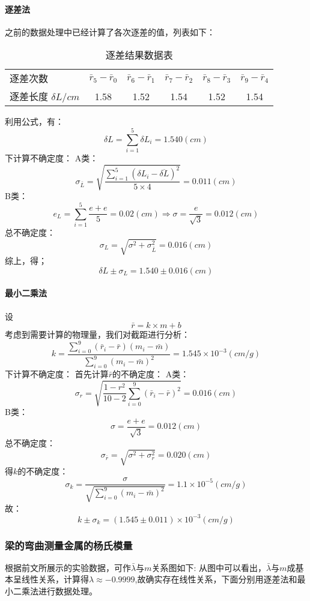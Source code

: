 \documentclass{ctexart}
\begin{document}
\paragraph{逐差法}之前的数据处理中已经计算了各次逐差的值，列表如下：
\begin{table}[H]
  \centering
  \caption{逐差结果数据表}
    \begin{tabular}{lccccc}
    逐差次数  & \multicolumn{1}{l}{$\bar{r}_5-\bar{r}_0$} & \multicolumn{1}{l}{$\bar{r}_6-\bar{r}_1$} & \multicolumn{1}{l}{$\bar{r}_7-\bar{r}_2$} & \multicolumn{1}{l}{$\bar{r}_8-\bar{r}_3$} & \multicolumn{1}{l}{$\bar{r}_9-\bar{r}_4$} \\
    逐差长度 $\delta L/cm$ & 1.58  & 1.52  & 1.54  & 1.52  & 1.54  \\
    \end{tabular}%
  \label{tab:addlabel}%
\end{table}%

利用公式，有：
$$\delta L=\sum_{i=1}^5{\delta L_i}=1.540(cm)$$
下计算不确定度：
A类：$$\sigma_{\bar{L}}=\sqrt{\frac{\sum\limits_{i=1}^5{(\delta L_i-\overline{\delta L})^2}}{5\times4}}=0.011(cm)$$
B类：$$e_L=\sum\limits_{i=1}^5{\frac{e+e}5}=0.02(cm)\Rightarrow \sigma=\frac{e}{\sqrt{3}}=0.012(cm)$$
总不确定度：$$\sigma_L=\sqrt{\sigma^2+\sigma_{\bar{L}}^2}=0.016(cm)$$
综上，得；$$\delta L\pm \sigma_L=1.540\pm 0.016(cm)$$
\paragraph{最小二乘法}
设$$\bar{r}=k\times m+b$$
考虑到需要计算的物理量，我们对截距进行分析：
$$k=\frac{\sum\limits_{i=0}^9{(\bar{r}_i-\bar{r})(m_i-\bar{m})}}{\sum\limits_{i=0}^9{(m_i-\bar{m})^2}}=1.545\times 10^{-3}(cm/g)$$
下计算不确定度：
首先计算$\bar{r}$的不确定度：
A类：$$\sigma_r =\sqrt{\frac{1-r^2}{10-2}\sum\limits_{i=0}^9{(\bar{r}_i-\bar{r})^2}}=0.016(cm)$$
B类：$$\sigma=\frac{e+e}{\sqrt{3}}=0.012(cm)$$
总不确定度：$$\sigma_{\bar{r}}=\sqrt{\sigma^2+\sigma_r^2}=0.020(cm)$$
得$k$的不确定度：
$$\sigma_k=\frac{\sigma}{\sqrt{\sum\limits_{i=0}^9{(m_i-\bar{m})^2}}}=1.1\times10^{-5}(cm/g)$$
故：
$$k\pm \sigma_k=(1.545\pm 0.011  )\times 10^{-3}(cm/g)$$
\subsubsection{梁的弯曲测量金属的杨氏模量}
根据前文所展示的实验数据，可作$\bar{\lambda}$与$m$关系图如下:
从图中可以看出，$\bar{\lambda}$与$m$成基本呈线性关系，计算得$\lambda \approx -0.9999$,故确实存在线性关系，下面分别用逐差法和最小二乘法进行数据处理。
\end{document}
